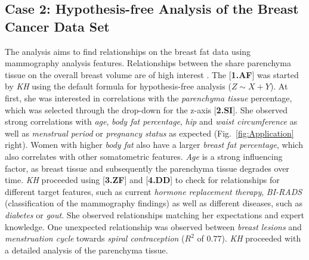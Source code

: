 \documentclass[journal]{style/vgtc} 			          %
\begin{document}
\subsection{Case 2: Hypothesis-free Analysis of the Breast Cancer Data Set}
The analysis aims to find relationships on the breast fat data using mammography analysis features.
Relationships between the share parenchyma tissue on the overall breast volume are of high interest \cite{Mccormack2006}.
The [\textbf{1.AF}] was started by \emph{KH} using the default formula for hypothesis-free analysis ($Z \sim X + Y$).
At first, she was interested in correlations with the \emph{parenchyma tissue} percentage, which was selected through the drop-down for the z-axis [\textbf{2.SI}].
She observed strong correlations with \emph{age}, \emph{body fat percentage}, \emph{hip} and \emph{waist circumference} as well as \emph{menstrual period} or \emph{pregnancy status} as expected (Fig.~\ref{fig:Application} right).
Women with higher \emph{body fat} also have a larger \emph{breast fat percentage}, which also correlates with other somatometric features.
\emph{Age} is a strong influencing factor, as breast tissue and subsequently the parenchyma tissue degrades over time.
\emph{KH} proceeded using [\textbf{3.ZF}] and [\textbf{4.DD}] to check for relationships for different target features, such as current \emph{hormone replacement therapy}, \emph{BI-RADS} (classification of the mammography findings) as well as different diseases, such as \emph{diabetes} or \emph{gout}.
She observed relationships matching her expectations and expert knowledge.
One unexpected relationship was observed between \emph{breast lesions} and \emph{menstruation cycle} towards \emph{spiral contraception} ($R^2$ of $0.77$).
\emph{KH} proceeded with a detailed analysis of the parenchyma tissue.
\end{document}
